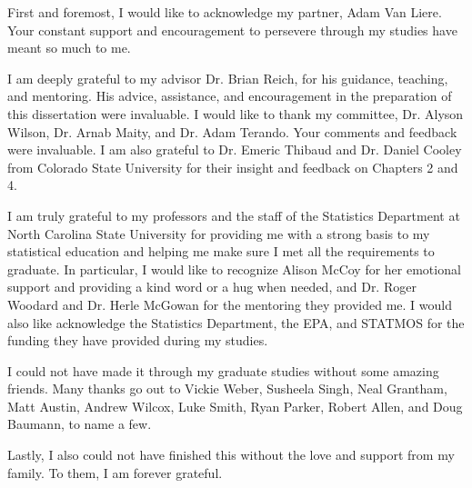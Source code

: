 \begin{acknowledgements}
First and foremost, I would like to acknowledge my partner, Adam Van Liere.
Your constant support and encouragement to persevere through my studies have meant so much to me.

I am deeply grateful to my advisor Dr. Brian Reich, for his guidance, teaching, and mentoring. 
His advice, assistance, and encouragement in the preparation of this dissertation were invaluable.
I would like to thank my committee, Dr. Alyson Wilson, Dr. Arnab Maity, and Dr. Adam Terando.
Your comments and feedback were invaluable. 
I am also grateful to Dr. Emeric Thibaud and Dr. Daniel Cooley from Colorado State University for their insight and feedback on Chapters 2 and 4.

I am truly grateful to my professors and the staff of the Statistics Department at North Carolina State University for providing me with a strong basis to my statistical education and helping me make sure I met all the requirements to graduate.
In particular, I would like to recognize Alison McCoy for her emotional support and providing a kind word or a hug when needed, and Dr. Roger Woodard and Dr. Herle McGowan for the mentoring they provided me. 
I would also like acknowledge the Statistics Department, the EPA, and STATMOS for the funding they have provided during my studies.

I could not have made it through my graduate studies without some amazing friends.
Many thanks go out to Vickie Weber, Susheela Singh, Neal Grantham, Matt Austin, Andrew Wilcox, Luke Smith, Ryan Parker, Robert Allen, and Doug Baumann, to name a few.

Lastly, I also could not have finished this without the love and support from my family.
To them, I am forever grateful.

\end{acknowledgements}


\thesistableofcontents

\thesislistoftables

\thesislistoffigures
